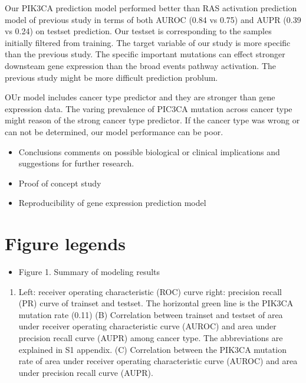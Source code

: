 \documentclass[10pt,letterpaper]{article}
\providecommand{\tightlist}{%
  \setlength{\itemsep}{0pt}\setlength{\parskip}{0pt}}
\begin{document}
Our PIK3CA prediction model performed better than RAS activation
prediction model of previous study in terms of both AUROC (0.84 vs 0.75)
and AUPR (0.39 vs 0.24) on testset prediction. Our testset is
corresponding to the samples initially filtered from training. The
target variable of our study is more specific than the previous study.
The specific important mutations can effect stronger downsteam gene
expression than the broad events pathway activation. The previous study
might be more difficult prediction problum.

OUr model includes cancer type predictor and they are stronger than gene
expression data. The varing prevalence of PIC3CA mutation across cancer
type might reason of the strong cancer type predictor. If the cancer
type was wrong or can not be determined, our model performance can be
poor.

\begin{itemize}
\item
  Conclusions comments on possible biological or clinical implications
  and suggestions for further research.
\item
  Proof of concept study\\
\item
  Reproducibility of gene expression prediction model
\end{itemize}

\hypertarget{figure-legends}{%
\section{Figure legends}\label{figure-legends}}

\begin{itemize}
\tightlist
\item
  Figure 1. Summary of modeling results
\end{itemize}

\begin{enumerate}
\def\labelenumi{(\Alph{enumi})}
\tightlist
\item
  Left: receiver operating characteristic (ROC) curve right: precision
  recall (PR) curve of trainset and testset. The horizontal green line
  is the PIK3CA mutation rate (0.11) (B) Correlation between trainset
  and testset of area under receiver operating characteristic curve
  (AUROC) and area under precision recall curve (AUPR) among cancer
  type. The abbreviations are explained in S1 appendix. (C) Correlation
  between the PIK3CA mutation rate of area under receiver operating
  characteristic curve (AUROC) and area under precision recall curve
  (AUPR).
\end{enumerate}
\end{document}
